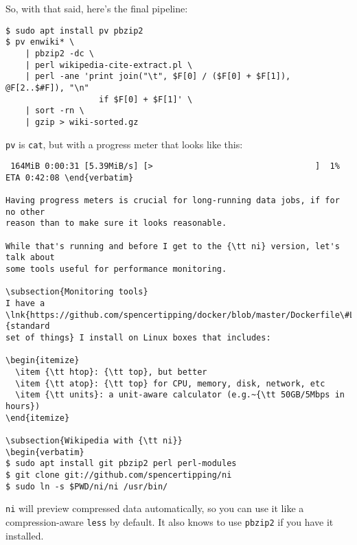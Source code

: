 So, with that said, here's the final pipeline:

\begin{verbatim}
$ sudo apt install pv pbzip2
$ pv enwiki* \
    | pbzip2 -dc \
    | perl wikipedia-cite-extract.pl \
    | perl -ane 'print join("\t", $F[0] / ($F[0] + $F[1]), @F[2..$#F]), "\n"
                   if $F[0] + $F[1]' \
    | sort -rn \
    | gzip > wiki-sorted.gz\end{verbatim}

{\tt pv} is {\tt cat}, but with a progress meter that looks like this:

\begin{verbatim}
 164MiB 0:00:31 [5.39MiB/s] [>                                 ]  1% ETA 0:42:08 \end{verbatim}

Having progress meters is crucial for long-running data jobs, if for no other
reason than to make sure it looks reasonable.

While that's running and before I get to the {\tt ni} version, let's talk about
some tools useful for performance monitoring.

\subsection{Monitoring tools}
I have a
\lnk{https://github.com/spencertipping/docker/blob/master/Dockerfile\#L20}{standard
set of things} I install on Linux boxes that includes:

\begin{itemize}
  \item {\tt htop}: {\tt top}, but better
  \item {\tt atop}: {\tt top} for CPU, memory, disk, network, etc
  \item {\tt units}: a unit-aware calculator (e.g.~{\tt 50GB/5Mbps in hours})
\end{itemize}

\subsection{Wikipedia with {\tt ni}}
\begin{verbatim}
$ sudo apt install git pbzip2 perl perl-modules
$ git clone git://github.com/spencertipping/ni
$ sudo ln -s $PWD/ni/ni /usr/bin/\end{verbatim}

{\tt ni} will preview compressed data automatically, so you can use it like a
compression-aware {\tt less} by default. It also knows to use {\tt pbzip2} if
you have it installed.

